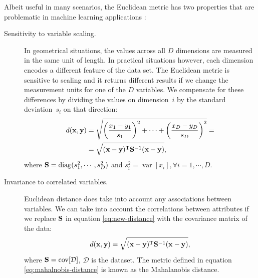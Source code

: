 Albeit useful in many scenarios, the Euclidean metric has two properties that are problematic in machine learning applications \citep{dwinnell-online}:
	\begin{description}
		 \item[Sensitivity to variable scaling.]{ In geometrical situations, the values across all $D$ dimensions are measured in the same unit of length. In practical situations however, each dimension encodes a different feature of the data set. The Euclidean metric is sensitive to scaling and it returns different results if we change the measurement units for one of the $D$ variables. We compensate for these differences by dividing the values on dimension~$i$ by the standard deviation~$s_i$ on that direction:
		  \begin{align}
		   d(\mathbf{x},\mathbf{y}) &= \sqrt{\left(\frac{x_1-y_1}{s_1}\right)^2+\cdots+\left(\frac{x_D-y_D}{s_D}\right)^2} = \notag\\
		   &= \sqrt{(\mathbf{x-y})^\textrm{T}\mathbf{S}^{-1}(\mathbf{x-y})}, \label{eq:new-distance}
		  \end{align}
		 where $\mathbf{S}=\operatorname{diag}(s_1^2,\cdots,s_D^2)$ and $s_i^2 = \operatorname{var}[x_i],\forall i=1,\cdots,D$.
		 }
		 \item[Invariance to correlated variables.] {Euclidean distance does take into account any associations between variables. We can take into account the correlations between attributes if we replace $\mathbf{S}$ in equation \eqref{eq:new-distance} with the covariance matrix of the data:
		 \begin{align}
		 d(\mathbf{x},\mathbf{y}) = \sqrt{(\mathbf{x-y})^\textrm{T}\mathbf{S}^{-1}(\mathbf{x-y})},
		 \label{eq:mahalnobis-distance}
		 \end{align}
		 where $\mathbf{S} = \operatorname{cov}[\mathcal{D}]$, $\mathcal{D}$ is the dataset. The metric defined in equation \eqref{eq:mahalnobis-distance} is known as the Mahalanobis distance. %
		 }
	\end{description}
